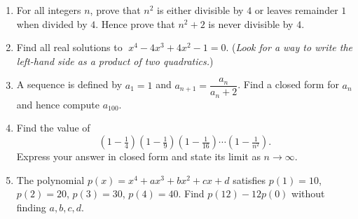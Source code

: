 \documentclass[11pt,a4paper]{article}
\begin{document}
\begin{enumerate}

\item For all integers $n$, prove that $n^2$ is either divisible by $4$
      or leaves remainder $1$ when divided by $4$.
      Hence prove that $n^2 + 2$ is never divisible by $4$.

\item Find all real solutions to $\;x^4 - 4x^3 + 4x^2 - 1 = 0$.
      (\textit{Look for a way to write the left-hand side as a product of two quadratics.})

\item A sequence is defined by $a_1 = 1$ and $a_{n+1} = \dfrac{a_n}{a_n + 2}$.
      Find a closed form for $a_n$ and hence compute $a_{100}$.

\item Find the value of
\[
  \left(1 - \tfrac{1}{4}\right)\!\left(1 - \tfrac{1}{9}\right)\!\left(1 - \tfrac{1}{16}\right)
    \cdots\left(1 - \tfrac{1}{n^2}\right).
\]
Express your answer in closed form and state its limit as $n \to \infty$.

\item The polynomial $p(x) = x^4 + ax^3 + bx^2 + cx + d$ satisfies $p(1) = 10$,
      $p(2) = 20$, $p(3) = 30$, $p(4) = 40$. Find $p(12) - 12p(0)$ without finding $a,b,c,d$.

\end{enumerate}

\end{document}
